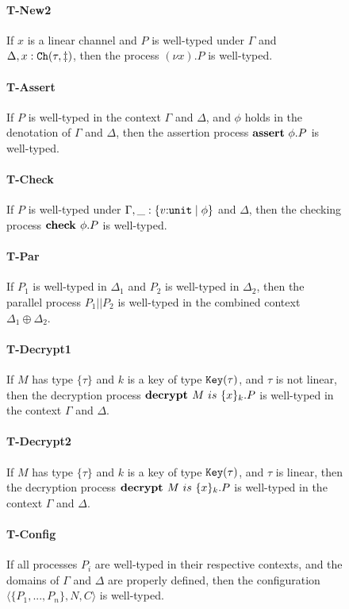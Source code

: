 \documentclass[master,english]{kuisthesis}
\theoremstyle{definition}
\begin{document}
\begin{figure}
\paragraph{T-New2} If \(x\) is a linear channel and \(P\) is well-typed under \(\Gamma\) and \(\Delta, x: {\tt Ch}({\tau, \ddagger})\), then the process \((\nu x).P\) is well-typed.

\paragraph{T-Assert} If \(P\) is well-typed in the context \(\Gamma\) and \(\Delta\), and \(\phi\) holds in the denotation of \(\Gamma\) and \(\Delta\), then the assertion process \(\mathbf{assert}\ {\phi}.P\) is well-typed.

\paragraph{T-Check} If \(P\) is well-typed under \(\Gamma, \_: \{v{:}{{\tt unit}} \;|\; {\phi}\}\) and \(\Delta\), then the checking process \(\textbf{check }{\phi}.P\) is well-typed.

\paragraph{T-Par} If \(P_1\) is well-typed in \(\Delta_1\) and \(P_2\) is well-typed in \(\Delta_2\), then the parallel process \(P_1 || P_2\) is well-typed in the combined context \(\Delta_1 \oplus \Delta_2\).

\paragraph{T-Decrypt1} If \(M\) has type \(\{\tau\}\) and \(k\) is a key of type \({\tt Key}({\tau})\), and \(\tau\) is not linear, then the decryption process \(\textbf{decrypt }{M}~is~\{{x}\}_{k}.P\) is well-typed in the context \(\Gamma\) and \(\Delta\).

\paragraph{T-Decrypt2} If \(M\) has type \(\{\tau\}\) and \(k\) is a key of type \({\tt Key}({\tau})\), and \(\tau\) is linear, then the decryption process \(\textbf{decrypt }{M}~is~\{{x}\}_{k}.P\) is well-typed in the context \(\Gamma\) and \(\Delta\).

\paragraph{T-Config} If all processes \(P_i\) are well-typed in their respective contexts, and the domains of \(\Gamma\) and \(\Delta\) are properly defined, then the configuration \(\langle\{P_1, ...,P_n \}, N, C\rangle\) is well-typed.


\end{figure}
\end{document}
